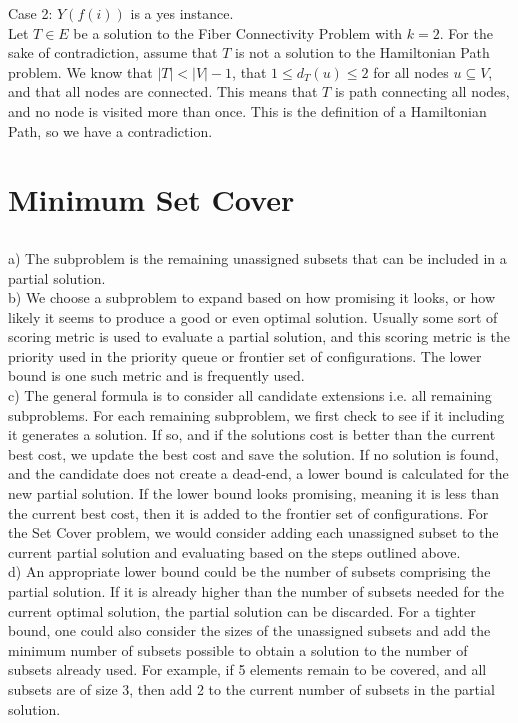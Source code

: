 \documentclass{article}
\begin{document}
Case 2: $Y(f(i))$ is a yes instance. \\
Let $T \in E$ be a solution to the Fiber Connectivity Problem with $k=2$. For the sake of contradiction, assume that $T$ is not a solution to the Hamiltonian Path problem. We know that $|T|<|V|-1$, that $1 \leq d_T(u) \leq 2$ for all nodes $u \subseteq V$, and that all nodes are connected. This means that $T$ is path connecting all nodes, and no node is visited more than once. This is the definition of a Hamiltonian Path, so we have a contradiction.

\newpage
\section{Minimum Set Cover}

\subsection{}

a) The subproblem is the remaining unassigned subsets that can be included in a partial solution.\\

b) We choose a subproblem to expand based on how promising it looks, or how likely it seems to produce a good or even optimal solution. Usually some sort of scoring metric is used to evaluate a partial solution, and this scoring metric is the priority used in the priority queue or frontier set of configurations. The lower bound is one such metric and is frequently used.\\

c) The general formula is to consider all candidate extensions i.e. all remaining subproblems. For each remaining subproblem, we first check to see if it including it generates a solution. If so, and if the solutions cost is better than the current best cost, we update the best cost and save the solution. If no solution is found, and the candidate does not create a dead-end, a lower bound is calculated for the new partial solution. If the lower bound looks promising, meaning it is less than the current best cost, then it is added to the frontier set of configurations. For the Set Cover problem, we would consider adding each unassigned subset to the current partial solution and evaluating based on the steps outlined above. \\

d) An appropriate lower bound could be the number of subsets comprising the partial solution. If it is already higher than the number of subsets needed for the current optimal solution, the partial solution can be discarded. For a tighter bound, one could also consider the sizes of the unassigned subsets and add the minimum number of subsets possible to obtain a solution to the number of subsets already used. For example, if 5 elements remain to be covered, and all subsets are of size 3, then add 2 to the current number of subsets in the partial solution.\\
\end{document}
